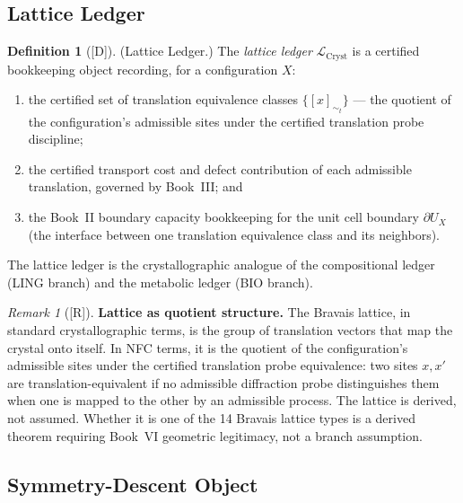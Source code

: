 \documentclass[12pt,oneside]{amsbook}
\theoremstyle{plain}
\theoremstyle{definition}
\newtheorem{definition}[theorem]{Definition}
\theoremstyle{remark}
\newtheorem{remark}[theorem]{Remark}
\newcommand{\status}[1]{\textup{[#1]}}
\begin{document}
\subsection{Lattice Ledger}

\begin{definition}[\status{D}]\label{def:cryst-lattice-ledger}
\textup{(Lattice Ledger.)}
The \emph{lattice ledger} $\mathcal{L}_{\mathrm{Cryst}}$ is a
certified bookkeeping object recording, for a configuration $X$:
\begin{enumerate}[label=\textup{(\arabic*)}]
  \item the certified set of translation equivalence classes
    $\{[x]_{\sim_t}\}$ --- the quotient of the configuration's
    admissible sites under the certified translation probe discipline;
  \item the certified transport cost and defect contribution of each
    admissible translation, governed by Book~III; and
  \item the Book~II boundary capacity bookkeeping for the unit cell
    boundary $\partial U_X$ (the interface between one translation
    equivalence class and its neighbors).
\end{enumerate}
The lattice ledger is the crystallographic analogue of the
compositional ledger (LING branch) and the metabolic ledger (BIO
branch).
\end{definition}

\begin{remark}[\status{R}]\label{rem:cryst-translation-equiv}
\textbf{Lattice as quotient structure.}
The Bravais lattice, in standard crystallographic terms, is the
group of translation vectors that map the crystal onto itself.
In NFC terms, it is the quotient of the configuration's admissible
sites under the certified translation probe equivalence: two sites
$x, x'$ are translation-equivalent if no admissible diffraction
probe distinguishes them when one is mapped to the other by an
admissible process.  The lattice is derived, not assumed.  Whether
it is one of the 14 Bravais lattice types is a derived theorem
requiring Book~VI geometric legitimacy, not a branch assumption.
\end{remark}

\subsection{Symmetry-Descent Object}
\end{document}
